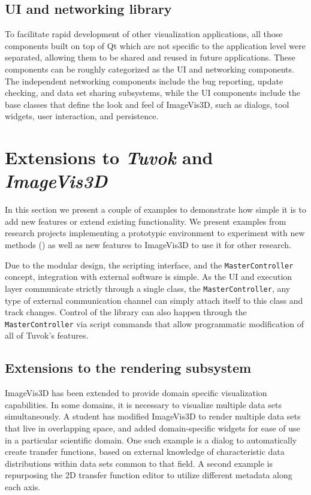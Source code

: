 \subsection{UI and networking library}

To facilitate rapid development of other visualization applications,
all those components built on top of Qt which are
not specific to the application level were separated, allowing
them to be shared and reused in future applications. These
components can be roughly categorized as the UI and networking
components. The independent networking components
include the bug reporting, update checking, and data
set sharing subsystems, while the UI components include
the base classes that define the look and feel of ImageVis3D,
such as dialogs, tool widgets, user interaction, and persistence.

\section{Extensions to \textit{Tuvok} and \textit{ImageVis3D}}
\label{sec:tvk-extensions}

In this section we present a couple of examples to
demonstrate how simple it is to add new features or extend
existing functionality. We present examples from research
projects implementing a prototypic environment to experiment
with new methods () as well as new
features to ImageVis3D to use it for other research.

Due to the modular design, the scripting interface, and
the \texttt{MasterController} concept, integration with external
software is simple. As the UI and execution layer communicate
strictly through a single class, the \texttt{MasterController}, any
type of external communication channel can simply attach
itself to this class and track changes. Control of the library
can also happen through the \texttt{MasterController} via script
commands that allow programmatic modification of all of
Tuvok's features.

\subsection{Extensions to the rendering subsystem}
\label{sec:arch-rendering-exts}

ImageVis3D has been extended to provide domain specific
visualization capabilities. In some domains, it is necessary
to visualize multiple data sets simultaneously. A student has
modified ImageVis3D to render multiple data sets that live in
overlapping space, and added domain-specific widgets for
ease of use in a particular scientific domain. One such example
is a dialog to automatically create transfer functions,
based on external knowledge of characteristic data distributions
within data sets common to that field. A second example
is repurposing the 2D transfer function editor to utilize
different metadata along each axis.

